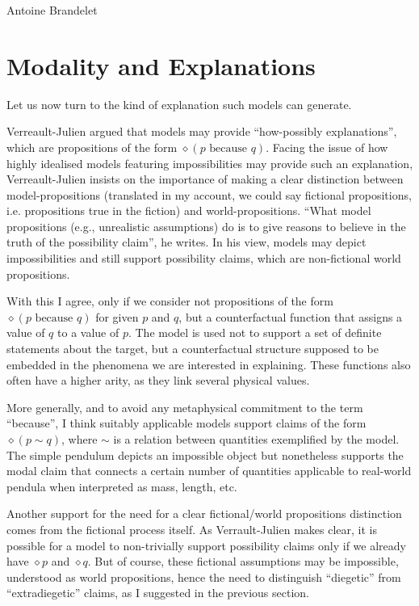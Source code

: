 \begin{artengenv}{Antoine Brandelet}
\section{Modality and Explanations}\label{sec:modality}


Let us now turn to the kind of explanation such models can generate.

Verreault-Julien \parencite*{VerreaultJulien2019} argued that models may provide ``how-possibly explanations'', which are propositions of the form $\diamond (p \text{ because } q)$. Facing the issue of how highly idealised models featuring impossibilities may provide such an explanation, Verreault-Julien insists on the importance of making a clear distinction between model-propositions (translated in my account, we could say fictional propositions, i.e. propositions true in the fiction) and world-propositions. ``What model propositions (e.g., unrealistic assumptions) do is to give reasons to believe in the truth of the possibility claim'', he writes. In his view, models may depict impossibilities and still support possibility claims, which are non-fictional world propositions.

With this I agree, only if we consider not propositions of the form $\diamond (p \text{ because } q)$ for given $p$ and $q$, but a counterfactual function that assigns a value of $q$ to a value of $p$. The model is used not to support a set of definite statements about the target, but a counterfactual structure supposed to be embedded in the phenomena we are interested in explaining. These functions also often have a higher arity, as they link several physical values.

More generally, and to avoid any metaphysical commitment to the term ``because'', I think suitably applicable models support claims of the form $\diamond (p \sim q)$, where $\sim$ is a relation between quantities exemplified by the model. The simple pendulum depicts an impossible object but nonetheless supports the modal claim that connects a certain number of quantities applicable to real-world pendula when interpreted as mass, length, etc.

Another support for the need for a clear fictional/world propositions  distinction comes from the fictional process itself. As Verrault-Julien makes clear, it is possible for a model to non-trivially support possibility claims only if we already have $\diamond p$ and $\diamond q$. But of course, these fictional assumptions may be impossible, understood as world propositions, hence the need to distinguish ``diegetic'' from ``extradiegetic'' claims, as I suggested in the previous section.


\end{artengenv}
